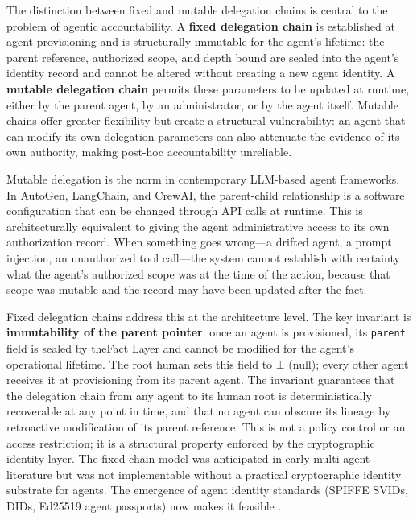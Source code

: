 The distinction between fixed and mutable delegation chains is central to the problem of agentic accountability. A \textbf{fixed delegation chain} is established at agent provisioning and is structurally immutable for the agent's lifetime: the parent reference, authorized scope, and depth bound are sealed into the agent's identity record and cannot be altered without creating a new agent identity. A \textbf{mutable delegation chain} permits these parameters to be updated at runtime, either by the parent agent, by an administrator, or by the agent itself. Mutable chains offer greater flexibility but create a structural vulnerability: an agent that can modify its own delegation parameters can also attenuate the evidence of its own authority, making post-hoc accountability unreliable.

Mutable delegation is the norm in contemporary LLM-based agent frameworks. In AutoGen, LangChain, and CrewAI, the parent-child relationship is a software configuration that can be changed through API calls at runtime. This is architecturally equivalent to giving the agent administrative access to its own authorization record. When something goes wrong---a drifted agent, a prompt injection, an unauthorized tool call---the system cannot establish with certainty what the agent's authorized scope was at the time of the action, because that scope was mutable and the record may have been updated after the fact.

Fixed delegation chains address this at the architecture level. The key invariant is \textbf{immutability of the parent pointer}: once an agent is provisioned, its \texttt{parent} field is sealed by theFact Layer and cannot be modified for the agent's operational lifetime. The root human sets this field to $\bot$ (null); every other agent receives it at provisioning from its parent agent. The invariant guarantees that the delegation chain from any agent to its human root is deterministically recoverable at any point in time, and that no agent can obscure its lineage by retroactive modification of its parent reference. This is not a policy control or an access restriction; it is a structural property enforced by the cryptographic identity layer. The fixed chain model was anticipated in early multi-agent literature \cite{padgham2001} but was not implementable without a practical cryptographic identity substrate for agents. The emergence of agent identity standards (SPIFFE SVIDs, DIDs, Ed25519 agent passports) now makes it feasible \cite{aps2025,draft-beyer-agent-identity-architecture-00}.

